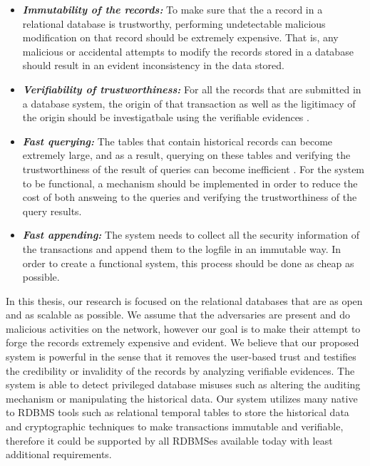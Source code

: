 		\begin{itemize}
			  \item \textbf{\textit{Immutability of the records:}} To make sure that the a record in a relational database is trustworthy, performing undetectable malicious modification on that record should be extremely expensive. That is, any malicious or accidental attempts to modify the records stored in a database should result in an evident inconsistency in the data stored.

			  \item \textbf{\textit{Verifiability of trustworthiness:}} For all the records that are submitted in a database system, the origin of that transaction as well as the ligitimacy of the origin should be investigatbale using the verifiable evidences .

			  \item \textbf{\textit{Fast querying:}} The tables that contain historical records can become extremely large, and as a result, querying on these tables and verifying the trustworthiness of the result of queries can become inefficient \cite{crosby2009tamper-evident}\cite{beirami2018snapshot}. For the system to be functional, a mechanism should be implemented in order to reduce the cost of both answeing to the queries and verifying the trustworthiness of the query results.

			  \item \textbf{\textit{Fast appending:}} The system needs to collect all the security information of the transactions and append them to the logfile in an immutable way. In order to create a functional system, this process should be done as cheap as possible.
	\end{itemize}
		In this thesis, our research is focused on the relational databases that are as open and as scalable as possible. We assume that the adversaries are present and do malicious activities on the network, however our goal is to make their attempt to forge the records extremely expensive and evident. We believe that our proposed system is powerful in the sense that it removes the user-based trust and testifies the credibility or invalidity of the records by analyzing verifiable evidences. The system is able to detect privileged database misuses such as altering the auditing mechanism or manipulating the historical data. Our system utilizes many native to RDBMS tools such as relational temporal tables to store the historical data and cryptographic techniques to make transactions immutable and verifiable, therefore it could be supported by all RDBMSes available today with least additional requirements.

